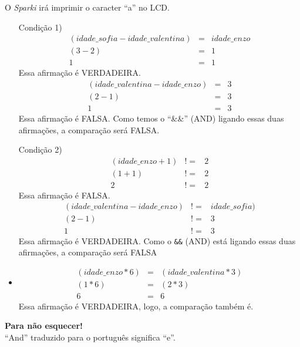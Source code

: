     
    O \textsl{Sparki} irá imprimir o caracter ``a'' no LCD.
    \begin{itemize}
        \item[Condição 1)]
        \begin{eqnarray}
        (idade\_sofia - idade\_valentina) & = & idade\_enzo\\
        (3 - 2) & = & 1 \nonumber \\
        1 & = & 1 \nonumber
        \end{eqnarray}
        Essa afirmação é VERDADEIRA.
        \begin{eqnarray}
        (idade\_valentina - idade\_enzo) & = & 3\\
        (2 - 1) & = & 3 \nonumber \\
        1 & = & 3 \nonumber
        \end{eqnarray}
        Essa afirmação é FALSA.
        Como temos o ``\&\&'' (AND) ligando essas duas afirmações, a comparação será FALSA.
        \item[Condição 2)] 
        \begin{eqnarray}
        (idade\_enzo + 1) & != & 2\\
        (1 + 1) & != & 2 \nonumber \\
        2 & != & 2 \nonumber
        \end{eqnarray}
        Essa afirmação é FALSA.
        \begin{eqnarray}
        (idade\_valentina - idade\_enzo) & != & idade\_sofia)\\
        (2 - 1) & != & 3 \nonumber \\
        1 & != & 3 \nonumber
        \end{eqnarray}
        Essa afirmação é VERDADEIRA. Como o \lstinline[columns=fixed]{&&} (AND) está ligando essas duas afirmações, a comparação será FALSA
        \item[Condição 3)] 
        \begin{eqnarray}
        (idade\_enzo * 6) & = & (idade\_valentina * 3)\\
        (1 * 6) & = & (2 * 3) \nonumber \\
        6 & = & 6 \nonumber 
        \end{eqnarray}
        Essa afirmação é VERDADEIRA, logo, a comparação também é.
    \end{itemize}
    
    \begin{center}
    \textcolor{mydarkblue}{\textbf{Para não esquecer!}}
    \\``And'' traduzido para o português significa ``e''.
    \end{center}
     
